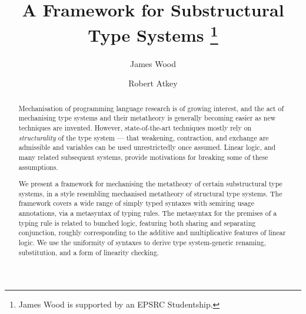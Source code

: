 \documentclass[runningheads]{llncs}
\begin{document}
%
\title{A Framework for Substructural Type Systems
  \thanks{James Wood is supported by an EPSRC Studentship.}}
%
%
\author{James Wood \and
  Robert Atkey}
%
%
%
\maketitle              %
%
\begin{abstract}
  Mechanisation of programming language research is of growing interest, and
  the act of mechanising type systems and their metatheory is generally becoming
  easier as new techniques are invented.
  However, state-of-the-art techniques mostly rely on \emph{structurality} of
  the type system --- that weakening, contraction, and exchange are admissible
  and variables can be used unrestrictedly once assumed.
  Linear logic, and many related subsequent systems, provide motivations for
  breaking some of these assumptions.

  We present a framework for mechanising the metatheory of certain
  substructural type systems, in a style resembling mechanised metatheory of
  structural type systems.
  The framework covers a wide range of simply typed syntaxes with semiring
  usage annotations, via a metasyntax of typing rules.
  The metasyntax for the premises of a typing rule is related to bunched logic,
  featuring both sharing and separating conjunction, roughly corresponding to
  the additive and multiplicative features of linear logic.
  We use the uniformity of syntaxes to derive type system-generic renaming,
  substitution, and a form of linearity checking.

\end{abstract}
\end{document}
